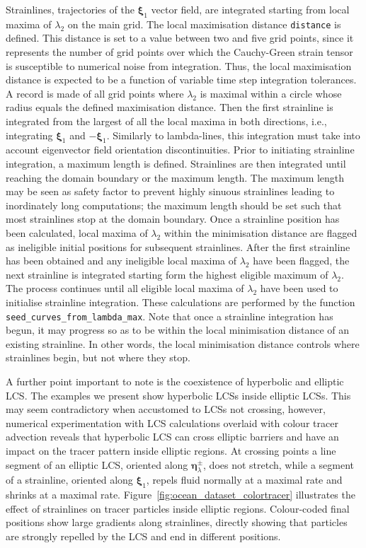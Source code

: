 \documentclass{article}
\begin{document}
Strainlines, trajectories of the $\boldsymbol \xi_1$ vector field, are integrated starting from local maxima of $\lambda_2$ on the main grid. The local maximisation distance \lstinline!distance! is defined. This distance is set to a value between two and five grid points, since it represents the number of grid points over which the Cauchy-Green strain tensor is susceptible to numerical noise from integration. Thus, the local maximisation distance is expected to be a function of variable time step integration tolerances. A record is made of all grid points where $\lambda_2$ is maximal within a circle whose radius equals the defined maximisation distance. Then the first strainline is integrated from the largest of all the local maxima in both directions, i.e., integrating $\boldsymbol \xi_1$ and $-\boldsymbol \xi_1$. Similarly to lambda-lines, this integration must take into account eigenvector field orientation discontinuities. Prior to initiating strainline integration, a maximum length is defined. Strainlines are then integrated until reaching the domain boundary or the maximum length. The maximum length may be seen as safety factor to prevent highly sinuous strainlines leading to inordinately long computations; the maximum length should be set such that most strainlines stop at the domain boundary. Once a strainline position has been calculated, local maxima of $\lambda_2$ within the minimisation distance are flagged as ineligible initial positions for subsequent strainlines. After the first strainline has been obtained and any ineligible local maxima of $\lambda_2$ have been flagged, the next strainline is integrated starting form the highest eligible maximum of $\lambda_2$. The process continues until all eligible local maxima of $\lambda_2$ have been used to initialise strainline integration. These calculations are performed by the function \lstinline!seed_curves_from_lambda_max!. Note that once a strainline integration has begun, it may progress so as to be within the local minimisation distance of an existing strainline. In other words, the local minimisation distance controls where strainlines begin, but not where they stop.

A further point important to note is the coexistence of hyperbolic and elliptic LCS. The examples we present show hyperbolic LCSs inside elliptic LCSs. This may seem contradictory when accustomed to LCSs not crossing, however, numerical experimentation with LCS calculations overlaid with colour tracer advection reveals that hyperbolic LCS can cross elliptic barriers and have an impact on the tracer pattern inside elliptic regions. At crossing points a line segment of an elliptic LCS, oriented along $\boldsymbol \eta_\lambda^{\pm}$, does not stretch, while a segment of a strainline, oriented along $\boldsymbol \xi_1$, repels fluid normally at a maximal rate and shrinks at a maximal rate. Figure~\ref{fig:ocean_dataset_colortracer} illustrates the effect of strainlines on tracer particles inside elliptic regions. Colour-coded final positions show large gradients along strainlines, directly showing that particles are strongly repelled by the LCS and end in different positions.
\end{document}
